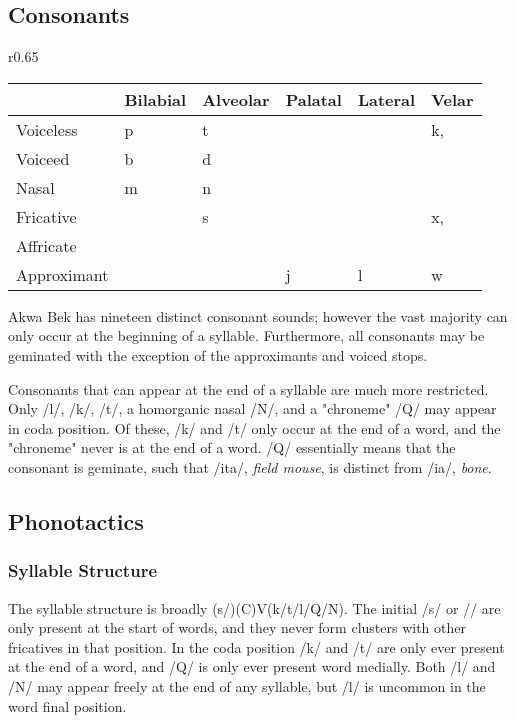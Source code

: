 \documentclass[11pt,letterpaper]{article}
\newcommand{\tx}{\textipa{S}}
\newcommand{\tj}{\textipa{\textbeltl}}
\newcommand{\tz}{\textipa{\t{ts}}}
\newcommand{\tc}{\textipa{\t{t\tx}}}
\newcommand{\tq}{\textipa{\t{t\tj}}}
\newcommand{\tkw}{\textipa{k\super w}}
\newcommand{\txw}{\textipa{x\super w}}
\begin{document}
  \subsection{Consonants}
  \label{consonants}
     \begin{wrapfigure}{r}{0.65\textwidth}
       \begin{tabular}{|l|l|l|l|l|l|}
         \hline
                     & Bilabial   & Alveolar & Palatal & Lateral & Velar     \\ \hline \hline
         Voiceless   & p          & t        &         &         & k, \tkw   \\
         Voiceed     & b          & d        &         &         &           \\
         Nasal       & m          & n        &         &         &           \\
         Fricative   &            & s        & \tx     &  \tj    & x, \txw   \\
         Affricate   &            & \tz      & \tc     &  \tq    &           \\
         Approximant &            &          & j       &  l      & w         \\ \hline
       \end{tabular}
     \end{wrapfigure}
     \par
     Akwa Bek has nineteen distinct consonant sounds; however the vast majority can only occur at the beginning of a syllable. Furthermore, all consonants may be geminated with the exception of the approximants and voiced stops.
     \par
     Consonants that can appear at the end of a syllable are much more restricted. Only /l/, /k/, /t/, a homorganic nasal /N/, and a "chroneme" /Q/ may appear in coda position. Of these, /k/ and /t/ only occur at the end of a word, and the "chroneme" never is at the end of a word. /Q/ essentially means that the consonant is geminate, such that /ita/, \textit{field mouse}, is distinct from /ia/, \textit{bone}.

  \subsection{Phonotactics}
  \label{phonotactics}

    \subsubsection{Syllable Structure}
    \label{syllables}
    The syllable structure is broadly (s/\tx)(C)V(k/t/l/Q/N). The initial /s/ or /\tx/ are only present at the start of words, and they never form clusters with other fricatives in that position. In the coda position /k/ and /t/ are only ever present at the end of a word, and /Q/ is only ever present word medially. Both /l/ and /N/ may appear freely at the end of any syllable, but /l/ is uncommon in the word final position.
\end{document}

